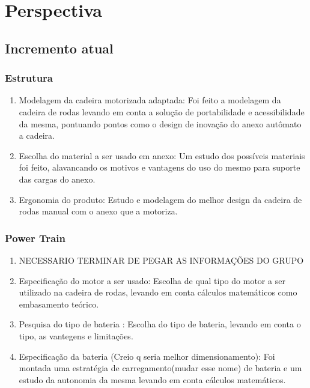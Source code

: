 \chapter[Perspectiva]{Perspectiva}

\section{Incremento atual}
  \subsection{Estrutura}
    \begin{enumerate}
      \item Modelagem da cadeira motorizada adaptada: Foi feito a modelagem da cadeira de rodas levando em conta a solução de portabilidade e acessibilidade da mesma, pontuando pontos como o design de inovação do anexo autômato a cadeira.

      \item Escolha do material a ser usado em anexo: Um estudo dos possíveis materiais foi feito, alavancando os motivos e vantagens do uso do mesmo para suporte das cargas do anexo.

      \item Ergonomia do produto: Estudo e modelagem do melhor design da cadeira de rodas manual com o anexo que a motoriza.
    \end{enumerate}
  \subsection{Power Train}
    \begin{enumerate}
      \item NECESSARIO TERMINAR DE PEGAR AS INFORMAÇÕES DO GRUPO
      \item Especificação do motor a ser usado: Escolha de qual tipo do motor a ser utilizado na cadeira de rodas, levando em conta cálculos matemáticos como embasamento teórico.

      \item Pesquisa do tipo de bateria : Escolha do tipo de bateria, levando em conta o tipo, as vantegens e limitações.

      \item Especificação da bateria (Creio q seria melhor dimensionamento): Foi montada uma estratégia de carregamento(mudar esse nome) de bateria e um estudo da autonomia da mesma levando em conta cálculos matemáticos.
    \end{enumerate}

